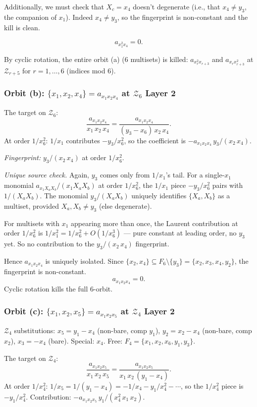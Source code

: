 \documentclass[11pt]{article}
\newcommand{\Z}{\mathcal{Z}}
\theoremstyle{definition}
\begin{document}
Additionally, we must check that $X_c = x_4$ doesn't degenerate (i.e., that
$x_4\ne y_3$, the companion of $x_1$). Indeed $x_4\ne y_3$, so the
fingerprint is non-constant and the kill is clean.

\[
\boxed{a_{x_1^2 x_4} = 0.}
\]

By cyclic rotation, the entire orbit (a) (6 multisets) is killed: $a_{x_r^2 x_{r+3}}$
and $a_{x_r x_{r+3}^2}$ at $\Z_{r+5}$ for $r=1,\ldots,6$ (indices mod 6).

\subsubsection*{Orbit (b): $\{x_1, x_2, x_4\} = a_{x_1 x_2 x_4}$ at $\Z_6$ Layer 2}

The target on $\Z_6$:
\[
\frac{a_{x_1 x_2 x_4}}{x_1\,x_2\,x_4} = \frac{a_{x_1 x_2 x_4}}{(y_3-x_6)\,x_2\,x_4}.
\]
At order $1/x_6^2$: $1/x_1$ contributes $-y_3/x_6^2$, so the coefficient is
$-a_{x_1 x_2 x_4}\,y_3/(x_2\,x_4)$.

\emph{Fingerprint:} $y_3/(x_2\,x_4)$ at order $1/x_6^2$.

\emph{Unique source check.} Again, $y_3$ comes only from $1/x_1$'s tail. For
a single-$x_1$ monomial $a_{x_1 X_a X_b}/(x_1 X_a X_b)$ at order $1/x_6^2$,
the $1/x_1$ piece $-y_3/x_6^2$ pairs with $1/(X_a X_b)$. The monomial
$y_3/(X_a X_b)$ uniquely identifies $\{X_a, X_b\}$ as a multiset, provided
$X_a, X_b\ne y_3$ (else degenerate).

For multisets with $x_1$ appearing more than once, the Laurent contribution
at order $1/x_6^2$ is
$1/x_1^2 = 1/x_6^2 + O(1/x_6^3)$ — pure constant at leading order, no
$y_3$ yet. So no contribution to the $y_3/(x_2\,x_4)$ fingerprint.

Hence $a_{x_1 x_2 x_4}$ is uniquely isolated. Since $\{x_2, x_4\}\subseteq
F_6\setminus\{y_3\}=\{x_2, x_3, x_4, y_2\}$, the fingerprint is non-constant.
\[
\boxed{a_{x_1 x_2 x_4} = 0.}
\]
Cyclic rotation kills the full 6-orbit.

\subsubsection*{Orbit (c): $\{x_1, x_2, x_5\} = a_{x_1 x_2 x_5}$ at $\Z_4$ Layer 2}

$\Z_4$ substitutions: $x_5 = y_1 - x_4$ (non-bare, comp $y_1$),
$y_2 = x_2 - x_4$ (non-bare, comp $x_2$), $x_3 = -x_4$ (bare).
Special: $x_4$. Free: $F_4 = \{x_1, x_2, x_6, y_1, y_3\}$.

The target on $\Z_4$:
\[
\frac{a_{x_1 x_2 x_5}}{x_1\,x_2\,x_5} = \frac{a_{x_1 x_2 x_5}}{x_1\,x_2\,(y_1-x_4)}.
\]
At order $1/x_4^2$: $1/x_5 = 1/(y_1-x_4) = -1/x_4-y_1/x_4^2-\cdots$,
so the $1/x_4^2$ piece is $-y_1/x_4^2$. Contribution:
$-a_{x_1 x_2 x_5}\,y_1/(x_4^2\,x_1\,x_2)$.
\end{document}
